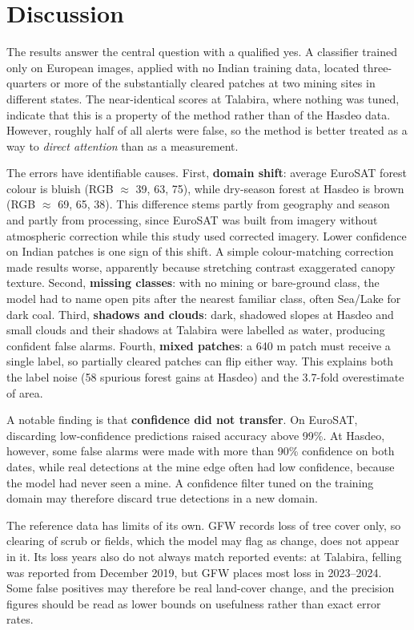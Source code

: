 \documentclass[11pt]{article}
\begin{document}
\section{Discussion}

The results answer the central question with a qualified yes. A classifier trained only on European images, applied with no Indian training data, located three-quarters or more of the substantially cleared patches at two mining sites in different states. The near-identical scores at Talabira, where nothing was tuned, indicate that this is a property of the method rather than of the Hasdeo data. However, roughly half of all alerts were false, so the method is better treated as a way to \emph{direct attention} than as a measurement.

The errors have identifiable causes. First, \textbf{domain shift}: average EuroSAT forest colour is bluish (RGB $\approx$ 39, 63, 75), while dry-season forest at Hasdeo is brown (RGB $\approx$ 69, 65, 38). This difference stems partly from geography and season and partly from processing, since EuroSAT was built from imagery without atmospheric correction while this study used corrected imagery. Lower confidence on Indian patches is one sign of this shift. A simple colour-matching correction made results worse, apparently because stretching contrast exaggerated canopy texture. Second, \textbf{missing classes}: with no mining or bare-ground class, the model had to name open pits after the nearest familiar class, often Sea/Lake for dark coal. Third, \textbf{shadows and clouds}: dark, shadowed slopes at Hasdeo and small clouds and their shadows at Talabira were labelled as water, producing confident false alarms. Fourth, \textbf{mixed patches}: a 640 m patch must receive a single label, so partially cleared patches can flip either way. This explains both the label noise (58 spurious forest gains at Hasdeo) and the 3.7-fold overestimate of area.

A notable finding is that \textbf{confidence did not transfer}. On EuroSAT, discarding low-confidence predictions raised accuracy above 99\%. At Hasdeo, however, some false alarms were made with more than 90\% confidence on both dates, while real detections at the mine edge often had low confidence, because the model had never seen a mine. A confidence filter tuned on the training domain may therefore discard true detections in a new domain.

The reference data has limits of its own. GFW records loss of tree cover only, so clearing of scrub or fields, which the model may flag as change, does not appear in it. Its loss years also do not always match reported events: at Talabira, felling was reported from December 2019, but GFW places most loss in 2023--2024. Some false positives may therefore be real land-cover change, and the precision figures should be read as lower bounds on usefulness rather than exact error rates.
\end{document}
